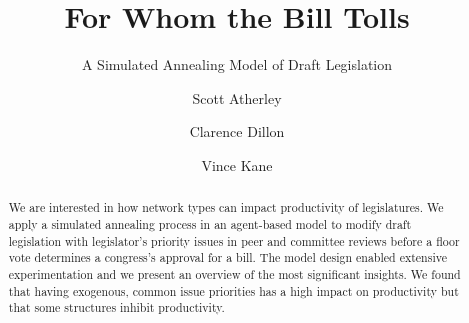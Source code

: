 \documentclass[pdftex,12pt]{llncs}
\begin{document}
%

\title{For Whom the Bill Tolls}

\subtitle{A Simulated Annealing Model of Draft Legislation}

\author{Scott Atherley \and Clarence Dillon \and Vince Kane}


\maketitle

\begin{abstract}
 We are interested in how network types can impact productivity of legislatures. 
 We apply a simulated annealing process in an agent-based model to modify draft legislation with legislator's priority issues in peer and committee reviews before a floor vote determines a congress's approval for a bill.
 The model design enabled extensive experimentation and we present an overview of the most significant insights. We found that having exogenous, common issue priorities has a high impact on productivity but that some structures inhibit productivity.
\end{abstract}
\end{document}
